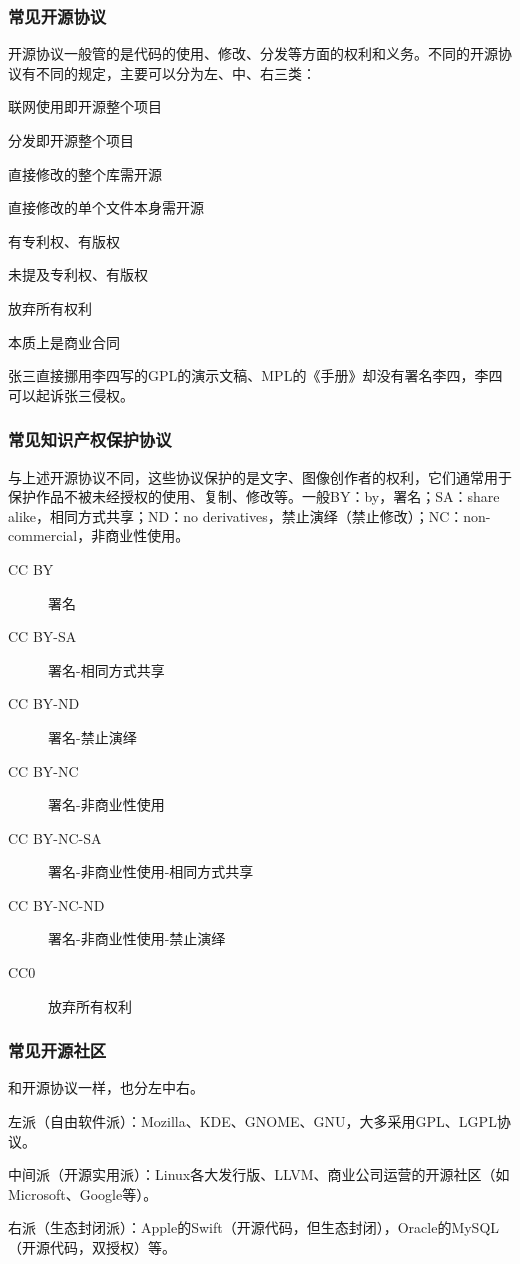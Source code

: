 \documentclass{ctexbeamer}
\begin{document}
\begin{frame}
    \frametitle{常见开源协议}
    开源协议一般管的是代码的使用、修改、分发等方面的权利和义务。不同的开源协议有不同的规定，主要可以分为左、中、右三类：
    \begin{description}
            \color{red}
        \item[AGPL] 联网使用即开源整个项目
        \item[GPL] 分发即开源整个项目
        \item[LGPL] 直接修改的整个库需开源
        \item[MPL] 直接修改的单个文件本身需开源
            \color{black}
        \item[Apache] 有专利权、有版权
        \item[BSD、MIT] 未提及专利权、有版权
        \item[Unlicenced] 放弃所有权利
            \color{blue}
        \item[商业许可证] 本质上是商业合同
    \end{description}
    张三直接挪用李四写的GPL的演示文稿、MPL的《手册》却没有署名李四，李四可以起诉张三侵权。
\end{frame}

\begin{frame}
    \frametitle{常见知识产权保护协议}

    与上述开源协议不同，这些协议保护的是文字、图像创作者的权利，它们通常用于保护作品不被未经授权的使用、复制、修改等。一般BY：by，署名；SA：share alike，相同方式共享；ND：no derivatives，禁止演绎（禁止修改）；NC：non-commercial，非商业性使用。

    \begin{description}
        \item[CC BY] 署名
        \item[CC BY-SA] 署名-相同方式共享
        \item[CC BY-ND] 署名-禁止演绎
        \item[CC BY-NC] 署名-非商业性使用
        \item[CC BY-NC-SA] 署名-非商业性使用-相同方式共享
        \item[CC BY-NC-ND] 署名-非商业性使用-禁止演绎
        \item[CC0] 放弃所有权利
    \end{description}

\end{frame}

\begin{frame}
    \frametitle{常见开源社区}
    和开源协议一样，也分左中右。

    左派（自由软件派）：Mozilla、KDE、GNOME、GNU，大多采用GPL、LGPL协议。

    中间派（开源实用派）：Linux各大发行版、LLVM、商业公司运营的开源社区（如Microsoft、Google等）。

    右派（生态封闭派）：Apple的Swift（开源代码，但生态封闭），Oracle的MySQL（开源代码，双授权）等。


\end{frame}
\end{document}
